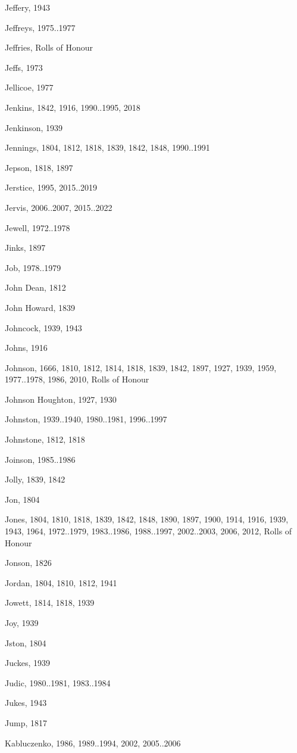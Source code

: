 {\begin{theindex}
\item Jeffery, 1943
\item Jeffreys, 1975..1977
\item Jeffries, Rolls of Honour
\item Jeffs, 1973
\item Jellicoe, 1977
\item Jenkins, 1842, 1916, 1990..1995, 2018
\item Jenkinson, 1939
\item Jennings, 1804, 1812, 1818, 1839, 1842, 1848, 1990..1991
\item Jepson, 1818, 1897
\item Jerstice, 1995, 2015..2019
\item Jervis, 2006..2007, 2015..2022
\item Jewell, 1972..1978
\item Jinks, 1897
\item Job, 1978..1979
\item John Dean, 1812
\item John Howard, 1839
\item Johncock, 1939, 1943
\item Johns, 1916
\item Johnson, 1666, 1810, 1812, 1814, 1818, 1839, 1842, 1897, 1927, 1939, 1959, 1977..1978, 1986, 2010, Rolls of Honour
\item Johnson Houghton, 1927, 1930
\item Johnston, 1939..1940, 1980..1981, 1996..1997
\item Johnstone, 1812, 1818
\item Joinson, 1985..1986
\item Jolly, 1839, 1842
\item Jon, 1804
\item Jones, 1804, 1810, 1818, 1839, 1842, 1848, 1890, 1897, 1900, 1914, 1916, 1939, 1943, 1964, 1972..1979, 1983..1986, 1988..1997, 2002..2003, 2006, 2012, Rolls of Honour
\item Jonson, 1826
\item Jordan, 1804, 1810, 1812, 1941
\item Jowett, 1814, 1818, 1939
\item Joy, 1939
\item Jston, 1804
\item Juckes, 1939
\item Judic, 1980..1981, 1983..1984
\item Jukes, 1943
\item Jump, 1817
\item Kabluczenko, 1986, 1989..1994, 2002, 2005..2006

\end{theindex}}
